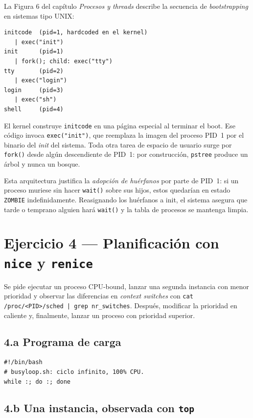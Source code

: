 \documentclass[11pt,a4paper]{article}
\begin{document}
La Figura 6 del capítulo \emph{Procesos y threads} describe la secuencia
de \emph{bootstrapping} en sistemas tipo UNIX:

\begin{lstlisting}[style=textstyle]
initcode  (pid=1, hardcoded en el kernel)
   | exec("init")
init      (pid=1)
   | fork(); child: exec("tty")
tty       (pid=2)
   | exec("login")
login     (pid=3)
   | exec("sh")
shell     (pid=4)
\end{lstlisting}

El kernel construye \texttt{initcode} en una página especial al terminar
el boot. Ese código invoca \texttt{exec("init")}, que reemplaza la imagen
del proceso PID~1 por el binario del \emph{init} del sistema. Toda otra
tarea de espacio de usuario surge por \texttt{fork()} desde algún
descendiente de PID~1: por construcción, \texttt{pstree} produce un
árbol y nunca un bosque.

Esta arquitectura justifica la \emph{adopción de huérfanos} por parte
de PID~1: si un proceso muriese sin hacer \texttt{wait()} sobre sus
hijos, estos quedarían en estado \texttt{ZOMBIE} indefinidamente.
Reasignando los huérfanos a init, el sistema asegura que tarde o
temprano alguien hará \texttt{wait()} y la tabla de procesos se mantenga
limpia.

\section{Ejercicio 4 --- Planificación con \texttt{nice} y \texttt{renice}}

Se pide ejecutar un proceso CPU-bound, lanzar una segunda instancia con
menor prioridad y observar las diferencias en \emph{context switches}
con \texttt{cat /proc/<PID>/sched | grep nr\_switches}. Después,
modificar la prioridad en caliente y, finalmente, lanzar un proceso
con prioridad superior.

\subsection*{4.a Programa de carga}

\begin{lstlisting}[style=shellstyle]
#!/bin/bash
# busyloop.sh: ciclo infinito, 100% CPU.
while :; do :; done
\end{lstlisting}

\subsection*{4.b Una instancia, observada con \texttt{top}}
\end{document}
